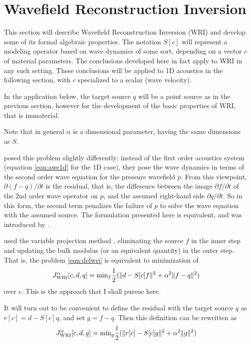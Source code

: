 \section{Wavefield Reconstruction Inversion}
This section will describe Wavefield Reconstruction Inversion (WRI)
and develop some of its formal algebraic properties. The notation
$S[c]$ will represent a modeling operator based on wave dynamics of
some sort, depending on a vector $c$ of material parameters. The
conclusions developed here in fact apply to WRI in any such
setting. These conclusions will be applied to 1D acoustics in the
following section, with $c$ specialized to a scalar (wave velocity).

In the application below, the target source $q$ will be a point source
as in the previous section, however for the development of the basic
properties of WRI, that is immaterial.

Note that in general $\alpha$ is a dimensional parameter, having the
same dimensions as $S$.

\cite{LeeuwenHerrmannWRI:13} posed this problem slightly differently:
instead of the first order acoustics system (equation \ref{eqn:awe1d}
for the 1D case), they pose the wave dynamics in terms of the second
order wave equation for the pressure wavefield $p$. From this
viewpoint, $\partial(f-q) /\partial t$ is the residual, that is, the
difference between the image $\partial f/\partial t$ of the 2nd order
wave operator on $p$, and the assumed right-hand side
$\partial q/\partial t$. So in this form, the second term penalizes
the failure of $p$ to solve the wave equation with the assumed
source. The formulation presented here is equivalent, and was
introduced by \cite{WangYingst:SEG16}.

\cite{LeeuwenHerrmann:16} used the variable projection method
\cite[]{GolubPereyra:03}, eliminating the source $f$ in the inner step
and updating the bulk modulus (or an equivalent quantity) in the outer
step. That is, the problem \ref{eqn:defwri} is equivalent to
minimization of
\[
  J_{\rm WRI}^{\alpha}[c,d,q] =
  \mbox{min}_f \frac{1}{2}(\| d-S[c]f\|^2+\alpha^2\|f-q\|^2)
\]
over $c$. This is the approach that I shall pursue here.

It will turn out to be convenient to define the residual with the
target source $q$ as $r[c]=d-S[c]q$, and set $g=f-q$. Then this
definition can be rewritten as
\begin{equation}
\label{eqn:defvpm}
  J_{\rm WRI}^{\alpha}[c,d,q] =\mbox{min}_g \frac{1}{2}(\| r[c]-S[c]g\|^2+\alpha^2\|g\|^2)
\end{equation}

